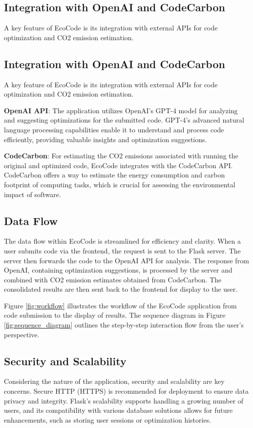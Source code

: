 \documentclass[conference,compsoc]{IEEEtran}
\begin{document}
\subsection{Integration with OpenAI and CodeCarbon}
A key feature of EcoCode is its integration with external APIs for code optimization and CO2 emission estimation.

\subsection{Integration with OpenAI and CodeCarbon}
A key feature of EcoCode is its integration with external APIs for code optimization and CO2 emission estimation.

\textbf{OpenAI API}: The application utilizes OpenAI's GPT-4 model for analyzing and suggesting optimizations for the submitted code. GPT-4's advanced natural language processing capabilities enable it to understand and process code efficiently, providing valuable insights and optimization suggestions.

\textbf{CodeCarbon}: For estimating the CO2 emissions associated with running the original and optimized code, EcoCode integrates with the CodeCarbon API. CodeCarbon offers a way to estimate the energy consumption and carbon footprint of computing tasks, which is crucial for assessing the environmental impact of software.

\subsection{Data Flow}
The data flow within EcoCode is streamlined for efficiency and clarity. When a user submits code via the frontend, the request is sent to the Flask server. The server then forwards the code to the OpenAI API for analysis. The response from OpenAI, containing optimization suggestions, is processed by the server and combined with CO2 emission estimates obtained from CodeCarbon. The consolidated results are then sent back to the frontend for display to the user.

Figure \ref{fig:workflow} illustrates the workflow of the EcoCode application from code submission to the display of results. The sequence diagram in Figure \ref{fig:sequence_diagram} outlines the step-by-step interaction flow from the user's perspective.

\subsection{Security and Scalability}
Considering the nature of the application, security and scalability are key concerns. Secure HTTP (HTTPS) is recommended for deployment to ensure data privacy and integrity. Flask's scalability supports handling a growing number of users, and its compatibility with various database solutions allows for future enhancements, such as storing user sessions or optimization histories.
\end{document}
